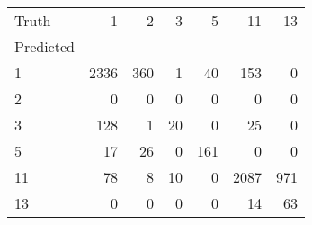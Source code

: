 \begin{tabular}{lrrrrrr}
\toprule
Truth & 1 & 2 & 3 & 5 & 11 & 13 \\
Predicted &  &  &  &  &  &  \\
\midrule
1 & 2336 & 360 & 1 & 40 & 153 & 0 \\
2 & 0 & 0 & 0 & 0 & 0 & 0 \\
3 & 128 & 1 & 20 & 0 & 25 & 0 \\
5 & 17 & 26 & 0 & 161 & 0 & 0 \\
11 & 78 & 8 & 10 & 0 & 2087 & 971 \\
13 & 0 & 0 & 0 & 0 & 14 & 63 \\
\bottomrule
\end{tabular}
